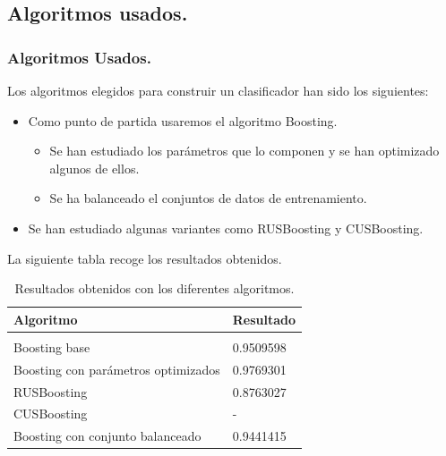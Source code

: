 \documentclass{beamer}
\theoremstyle{plain}
\theoremstyle{definition}
\theoremstyle{plain}
\theoremstyle{definition}
\theoremstyle{remark}
\theoremstyle{definition}
\begin{document}
\subsection{Algoritmos usados.}
\begin{frame}
	\tableofcontents[currentsection,currentsubsection,sections=2]
\end{frame}
	\begin{frame}
		\frametitle{Algoritmos Usados.}
		Los algoritmos elegidos para construir un clasificador han sido los siguientes:
	\begin{itemize}
		\item Como punto de partida usaremos el algoritmo Boosting.
			\begin{itemize}
				\item Se han estudiado los parámetros que lo componen y se han optimizado algunos de ellos.
				\item Se ha balanceado el conjuntos de datos de entrenamiento.
			\end{itemize} 
		\item Se han estudiado algunas variantes como RUSBoosting y CUSBoosting.
	\end{itemize}
	\end{frame}
\begin{frame}
	La siguiente tabla recoge los resultados obtenidos.
	\begin{table}[H]
		\centering
		\begin{tabular}{ll}
			\textbf{Algoritmo}& \textbf{Resultado} \\
			\hline
			\\
			Boosting base&    0.9509598  \\
			Boosting con parámetros optimizados& 0.9769301 \\
			RUSBoosting & 0.8763027 \\
			CUSBoosting &  -  \\
			Boosting con conjunto balanceado & 0.9441415  \\
		\end{tabular}
		\caption{Resultados obtenidos con los diferentes algoritmos.}
	\end{table}
\end{frame}
\end{document}
